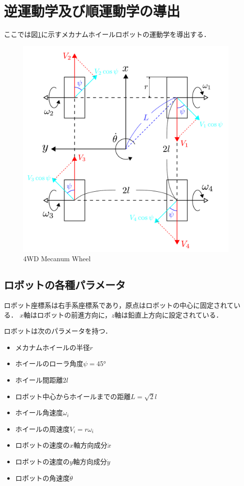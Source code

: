 \section{逆運動学及び順運動学の導出}

ここでは図\ref{fig:mecanum}に示すメカナムホイールロボットの運動学を導出する．

\begin{figure}[h]
  \centering
  \includegraphics[width=120truemm, clip]{images/mecanum.pdf}
  \caption{4WD Mecanum Wheel}
  \label{fig:mecanum}
\end{figure}

\subsection{ロボットの各種パラメータ}

ロボット座標系は右手系座標系であり，原点はロボットの中心に固定されている．
$x$軸はロボットの前進方向に，$z$軸は鉛直上方向に設定されている．



ロボットは次のパラメータを持つ．

\begin{itemize}
  \item メカナムホイールの半径$r$
  \item ホイールのローラ角度$\psi =$\ang{45}
  \item ホイール間距離$2l$
  \item ロボット中心からホイールまでの距離$L = \sqrt{2}l$
  \item ホイール角速度$\omega_{i}$
  \item ホイールの周速度$V_{i} = r\omega_{i}$
  \item ロボットの速度の$x$軸方向成分$\dot{x}$
  \item ロボットの速度の$y$軸方向成分$\dot{y}$
  \item ロボットの角速度$\dot{\theta}$
\end{itemize}

